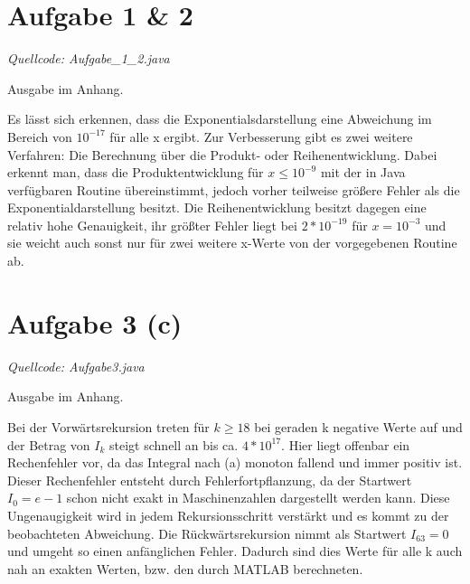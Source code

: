 \documentclass[11pt,a4paper]{article}
\begin{document}
\flushleft
\section*{Aufgabe 1 \& 2}
\textit{Quellcode: Aufgabe\_1\_2.java}

Ausgabe im Anhang.

Es lässt sich erkennen, dass die Exponentialsdarstellung eine Abweichung im Bereich von $10^{-17}$ für alle x ergibt. Zur Verbesserung gibt es zwei weitere Verfahren: Die Berechnung über die Produkt- oder Reihenentwicklung.
Dabei erkennt man, dass die Produktentwicklung für $x \le 10^{-9} $ mit der in Java verfügbaren Routine übereinstimmt, jedoch vorher teilweise größere Fehler als die Exponentialdarstellung besitzt. Die Reihenentwicklung besitzt dagegen eine relativ hohe Genauigkeit, ihr größter Fehler liegt bei $2*10^{-19}$ für $x=10^{-3}$ und sie weicht auch sonst nur für zwei weitere x-Werte von der vorgegebenen Routine ab.

\section*{Aufgabe 3 (c)}
\textit{Quellcode: Aufgabe3.java}

Ausgabe im Anhang.

Bei der Vorwärtsrekursion treten für $k\ge 18$ bei geraden k negative Werte auf und der Betrag von $I_k$ steigt schnell an bis ca. $4*10^{17}$. Hier liegt offenbar ein Rechenfehler vor, da das Integral nach (a) monoton fallend und immer positiv ist.
Dieser Rechenfehler entsteht durch Fehlerfortpflanzung, da der Startwert $I_0=e -1$ schon nicht exakt in Maschinenzahlen dargestellt werden kann. Diese Ungenaugigkeit wird in jedem Rekursionsschritt verstärkt und es kommt zu der beobachteten Abweichung.
Die Rückwärtsrekursion nimmt als Startwert $I_63=0$ und umgeht so einen anfänglichen Fehler. Dadurch sind dies Werte für alle k auch nah an exakten Werten, bzw. den durch MATLAB berechneten.
\end{document}
